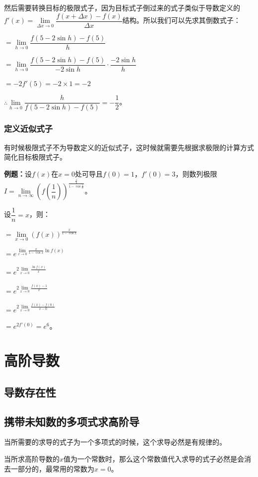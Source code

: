 然后需要转换目标的极限式子，因为目标式子倒过来的式子类似于导数定义的$f'(x)=\lim\limits_{\Delta x\to 0}\dfrac{f(x+\Delta x)-f(x)}{\Delta x}$结构。所以我们可以先求其倒数式子：\medskip

$=\lim\limits_{h\to 0}\dfrac{f(5-2\sin h)-f(5)}{h}$

$=\lim\limits_{h\to 0}\dfrac{f(5-2\sin h)-f(5)}{-2\sin h}\cdot\dfrac{-2\sin h}{h}$

$=-2f'(5)=-2\times 1=-2$

$\therefore\lim\limits_{h\to 0}\dfrac{h}{f(5-2\sin h)-f(5)}=-\dfrac{1}{2}$。

\subsubsection{定义近似式子}

有时候极限式子不为导数定义的近似式子，这时候就需要先根据求极限的计算方式简化目标极限式子。

\textbf{例题：}设$f(x)$在$x=0$处可导且$f(0)=1$，$f'(0)=3$，则数列极限$I=\lim\limits_{n\to\infty}\left(f\left(\dfrac{1}{n}\right)\right)^{\frac{\frac{1}{n}}{1-\cos\frac{1}{n}}}$。\medskip

设$\dfrac{1}{n}=x$，则：

$=\lim\limits_{x\to 0}(f(x))^{\frac{x}{1-\cos x}}$

$=e^{\lim\limits_{x\to 0}\frac{x}{1-\cos x}\ln f(x)}$

$=e^{2\lim\limits_{x\to 0}\frac{\ln f(x)}{x}}$

$=e^{2\lim\limits_{x\to 0}\frac{f(x)-1}{x}}$

$=e^{2\lim\limits_{x\to 0}\frac{f(x)-f(0)}{x-0}}$

$=e^{2f'(0)}=e^6$。


\section{高阶导数}

\subsection{导数存在性}

\subsection{携带未知数的多项式求高阶导}

当所需要的求导的式子为一个多项式的时候，这个求导必然是有规律的。

当所求高阶导数的$x$值为一个常数时，那么这个常数值代入求导的式子必然是会消去一部分的，最常用的常数为$x=0$。

